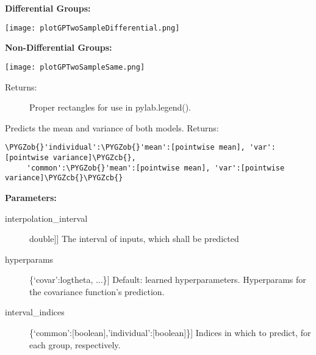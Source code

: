 \documentclass[letterpaper,10pt]{sphinxmanual}
\def\PYGZob{\char`\{}
\def\PYGZcb{\char`\}}
\begin{document}
\begin{fulllineitems}
\begin{fulllineitems}
\begin{description}
\end{description}

\textbf{Differential Groups:}

\texttt{[image: plotGPTwoSampleDifferential.png]}

\textbf{Non-Differential Groups:}

\texttt{[image: plotGPTwoSampleSame.png]}
\begin{description}
\item[{Returns:}] \leavevmode
Proper rectangles for use in pylab.legend().

\end{description}

\end{fulllineitems}


\begin{fulllineitems}
\label{base:gptwosample.twosample.twosample_base.TwoSampleBase.predict_mean_variance}
Predicts the mean and variance of both models.
Returns:

\begin{Verbatim}[commandchars=\\\{\}]
\PYGZob{}'individual':\PYGZob{}'mean':[pointwise mean], 'var':[pointwise variance]\PYGZcb{},
     'common':\PYGZob{}'mean':[pointwise mean], 'var':[pointwise variance]\PYGZcb{}\PYGZcb{}
\end{Verbatim}

\textbf{Parameters:}
\begin{description}
\item[{interpolation\_interval}] \leavevmode{[}{[}double{]}{]}
The interval of inputs, which shall be predicted

\item[{hyperparams}] \leavevmode{[}\{`covar':logtheta, ...\}{]}
Default: learned hyperparameters. Hyperparams for the covariance function's prediction.

\item[{interval\_indices}] \leavevmode{[}\{`common':{[}boolean{]},'individual':{[}boolean{]}\}{]}
Indices in which to predict, for each group, respectively.

\end{description}


\end{fulllineitems}
\end{fulllineitems}
\end{document}
